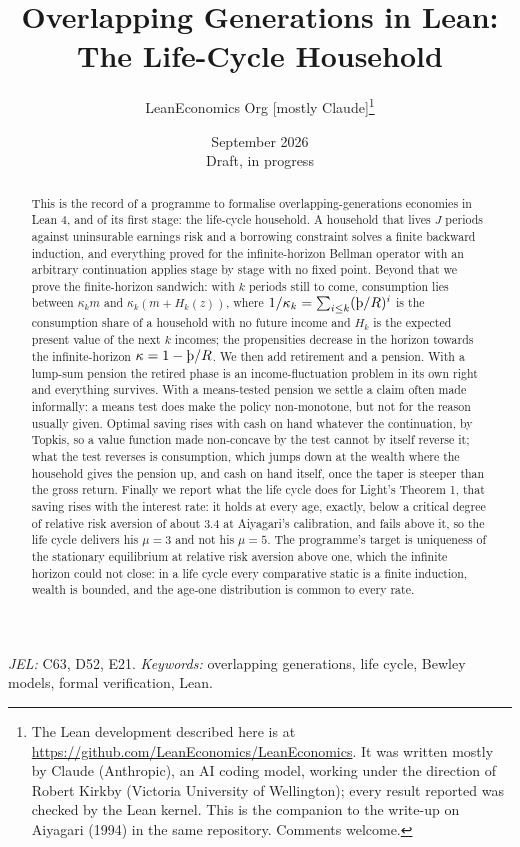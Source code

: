 \documentclass[11pt]{article}
\title{Overlapping Generations in Lean:\\ The Life-Cycle Household}
\author{LeanEconomics Org [mostly Claude]\thanks{The Lean development described here is at
\url{https://github.com/LeanEconomics/LeanEconomics}. It was written mostly by Claude (Anthropic),
an AI coding model, working under the direction of Robert Kirkby (Victoria University of
Wellington); every result reported was checked by the Lean kernel. This is the companion to the
write-up on Aiyagari (1994) in the same repository. Comments welcome.}}
\date{September 2026\\[0.5em]\small Draft, in progress}
\theoremstyle{definition}
\theoremstyle{remark}
\newcommand{\Thorn}{\text{\th}}
\begin{document}
\maketitle

\begin{abstract}
\noindent
This is the record of a programme to formalise overlapping-generations economies in Lean 4, and
of its first stage: the life-cycle household. A household that lives $J$ periods against
uninsurable earnings risk and a borrowing constraint solves a finite backward induction, and
everything proved for the infinite-horizon Bellman operator with an arbitrary continuation applies
stage by stage with no fixed point. Beyond that we prove the finite-horizon sandwich: with $k$
periods still to come, consumption lies between $\kappa_k m$ and $\kappa_k(m+H_k(z))$, where
$1/\kappa_k=\sum_{i\le k}(\Thorn/R)^i$ is the consumption share of a household with no future
income and $H_k$ is the expected present value of the next $k$ incomes; the propensities decrease
in the horizon towards the infinite-horizon $\kappa=1-\Thorn/R$. We then add retirement and a
pension. With a lump-sum pension the retired phase is an income-fluctuation problem in its own
right and everything survives. With a means-tested pension we settle a claim often made
informally: a means test does make the policy non-monotone, but not for the reason usually given.
Optimal saving rises with cash on hand whatever the continuation, by Topkis, so a value function
made non-concave by the test cannot by itself reverse it; what the test reverses is consumption,
which jumps down at the wealth where the household gives the pension up, and cash on hand itself,
once the taper is steeper than the gross return. Finally we report what the life cycle does for
Light's Theorem 1, that saving rises with the interest rate: it holds at every age, exactly, below
a critical degree of relative risk aversion of about $3.4$ at Aiyagari's calibration, and fails
above it, so the life cycle delivers his $\mu=3$ and not his $\mu=5$. The programme's target is
uniqueness of the stationary equilibrium at relative risk aversion above one, which the infinite
horizon could not close: in a life cycle every comparative static is a finite induction, wealth is
bounded, and the age-one distribution is common to every rate.
\end{abstract}

\noindent\emph{JEL:} C63, D52, E21. \quad \emph{Keywords:} overlapping generations, life cycle,
Bewley models, formal verification, Lean.










\appendix

\end{document}
